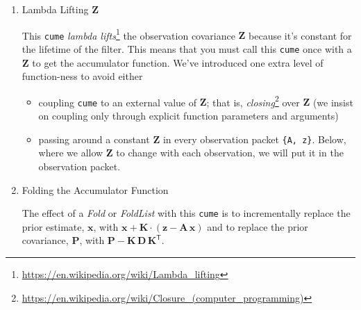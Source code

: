 \documentclass[10pt,oneside,x11names]{article}
\begin{document}
\begin{enumerate}
\noindent In all examples in this paper, the observations \(\mathbold{z}\) are
\(1\times{1}\) matrices, equivalent to scalars, so \(b=1\), but the theory and code
carry over to multi-dimensional vector observations.

We can see \emph{by inspection} that the dimensions of the
estimate\footnote{We sometimes use the center dot or the \(\times\) symbols to clarify
matrix multiplication. They have no other significance and we can always write
matrix multiplication just by juxtaposing the matrices.}
\(\mathbold{x}+\mathbold{K}\cdot(\mathbold{z}-\mathbold{A}\,\mathbold{x})\)
and the  covariance
\(\mathbold{P}-\mathbold{K}\,\mathbold{D}\,\mathbold{K}^{\mathsf{T}}\) are minimal
and correct.
This ``correct-by-inspection'' formulation is invaluable for checking
mathematics and code.

\item Lambda Lifting \(\mathbold{Z}\)
\label{sec:orgheadline14}

This \texttt{cume} \emph{lambda lifts}\footnote{\url{https://en.wikipedia.org/wiki/Lambda_lifting}} the observation covariance \(\mathbold{Z}\) because
it's constant for the lifetime of the filter. This means that you must
call this \texttt{cume} once with a \(\mathbold{Z}\) to get the accumulator function.
We've introduced one extra level of function-ness to avoid either
\begin{itemize}
\item coupling \texttt{cume} to an external value of \(\mathbold{Z}\); that is,
  \emph{closing}\footnote{\url{https://en.wikipedia.org/wiki/Closure_(computer_programming)}}
  over \(\mathbold{Z}\) (we insist on coupling only through explicit function
  parameters and arguments)
\item passing around a constant \(\mathbold{Z}\) in every observation packet \texttt{\{A, z\}}.
Below, where we allow \(\mathbold{Z}\) to change with each observation, we will
put it in the observation packet.
\end{itemize}

\item Folding the Accumulator Function
\label{sec:orgheadline15}

The effect of a \emph{Fold} or \emph{FoldList} with this \texttt{cume} is to incrementally
replace the prior estimate, \(\mathbold{x}\), with
\(\mathbold{x} +
\mathbold{K}\cdot
\left(
\mathbold{z}-
\mathbold{A}\,
\mathbold{x}
\right)\)
and to replace the prior covariance, \(\mathbold{P}\), with
\(\mathbold{P}-
\mathbold{K}\,
\mathbold{D}\,
\mathbold{K}^{\mathsf{T}}\).


\end{enumerate}
\end{document}
